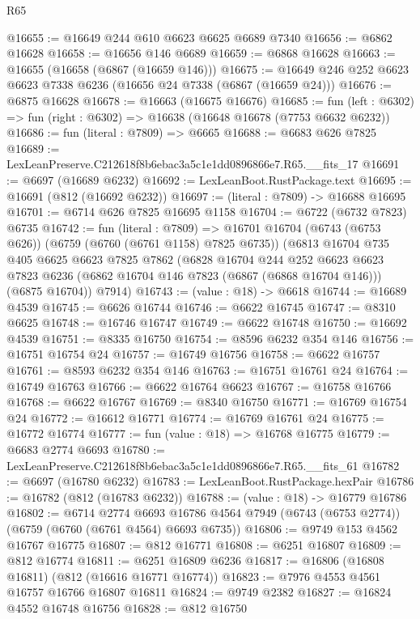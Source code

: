 \begin{lexlean}{R65}
\begin{coremodule}
{@16655 := @16649 @244 @610 @6623 @6625 @6689 @7340
@16656 := @6862 @16628
@16658 := @16656 @146 @6689
@16659 := @6868 @16628
@16663 := @16655 (@16658 (@6867 (@16659 @146)))
@16675 := @16649 @246 @252 @6623 @6623 @7338 @6236 (@16656 @24 @7338 (@6867 (@16659 @24)))
@16676 := @6875 @16628
@16678 := @16663 (@16675 @16676)
@16685 := fun (left : @6302) => fun (right : @6302) => @16638 (@16648 @16678 (@7753 @6632 @6232))
@16686 := fun (literal : @7809) => @6665
@16688 := @6683 @626 @7825
@16689 := LexLeanPreserve.C212618f8b6ebac3a5c1e1dd0896866e7.R65.__fits_17
@16691 := @6697 (@16689 @6232)
@16692 := LexLeanBoot.RustPackage.text
@16695 := @16691 (@812 (@16692 @6232))
@16697 := (literal : @7809) -> @16688 @16695
@16701 := @6714 @626 @7825 @16695 @1158
@16704 := @6722 (@6732 @7823) @6735
@16742 := fun (literal : @7809) =>
  @16701
    @16704
    (@6743 (@6753 @626))
    (@6759 (@6760 (@6761 @1158) @7825 @6735))
    (@6813
      @16704
      @735
      @405
      @6625
      @6623
      @7825
      @7862
      (@6828
        @16704
        @244
        @252
        @6623
        @6623
        @7823
        @6236
        (@6862 @16704 @146 @7823 (@6867 (@6868 @16704 @146)))
        (@6875 @16704))
      @7914)
@16743 := (value : @18) -> @6618
@16744 := @16689 @4539
@16745 := @6626 @16744
@16746 := @6622 @16745
@16747 := @8310 @6625
@16748 := @16746 @16747
@16749 := @6622 @16748
@16750 := @16692 @4539
@16751 := @8335 @16750
@16754 := @8596 @6232 @354 @146
@16756 := @16751 @16754 @24
@16757 := @16749 @16756
@16758 := @6622 @16757
@16761 := @8593 @6232 @354 @146
@16763 := @16751 @16761 @24
@16764 := @16749 @16763
@16766 := @6622 @16764 @6623
@16767 := @16758 @16766
@16768 := @6622 @16767
@16769 := @8340 @16750
@16771 := @16769 @16754 @24
@16772 := @16612 @16771
@16774 := @16769 @16761 @24
@16775 := @16772 @16774
@16777 := fun (value : @18) => @16768 @16775
@16779 := @6683 @2774 @6693
@16780 := LexLeanPreserve.C212618f8b6ebac3a5c1e1dd0896866e7.R65.__fits_61
@16782 := @6697 (@16780 @6232)
@16783 := LexLeanBoot.RustPackage.hexPair
@16786 := @16782 (@812 (@16783 @6232))
@16788 := (value : @18) -> @16779 @16786
@16802 := @6714
    @2774
    @6693
    @16786
    @4564
    @7949
    (@6743 (@6753 @2774))
    (@6759 (@6760 (@6761 @4564) @6693 @6735))
@16806 := @9749 @153 @4562 @16767 @16775
@16807 := @812 @16771
@16808 := @6251 @16807
@16809 := @812 @16774
@16811 := @6251 @16809 @6236
@16817 := @16806 (@16808 @16811) (@812 (@16616 @16771 @16774))
@16823 := @7976 @4553 @4561 @16757 @16766 @16807 @16811
@16824 := @9749 @2382
@16827 := @16824 @4552 @16748 @16756
@16828 := @812 @16750
}
\end{coremodule}
\end{lexlean}
